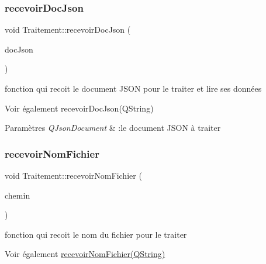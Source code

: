 \mbox{\label{classTraitement_aa66e6be8e21062472a6c1e9a95097dc5}} 
\subsubsection{\texorpdfstring{recevoir\+Doc\+Json}{recevoirDocJson}}
{\footnotesize\ttfamily void Traitement\+::recevoir\+Doc\+Json (\begin{DoxyParamCaption}\item[{Q\+Json\+Document}]{doc\+Json }\end{DoxyParamCaption})\hspace{0.3cm}{\ttfamily [slot]}}



fonction qui recoit le document J\+S\+ON pour le traiter et lire ses données 

\begin{DoxySeeAlso}{Voir également}
recevoir\+Doc\+Json(\+Q\+String) 
\end{DoxySeeAlso}

\begin{DoxyParams}{Paramètres}
{\em Q\+Json\+Document} & \+:le document J\+S\+ON à traiter \\
\hline
\end{DoxyParams}
\mbox{\label{classTraitement_aba97e5df1728c8062c3cb1b9fa104157}} 
\subsubsection{\texorpdfstring{recevoir\+Nom\+Fichier}{recevoirNomFichier}}
{\footnotesize\ttfamily void Traitement\+::recevoir\+Nom\+Fichier (\begin{DoxyParamCaption}\item[{Q\+String}]{chemin }\end{DoxyParamCaption})\hspace{0.3cm}{\ttfamily [slot]}}



fonction qui recoit le nom du fichier pour le traiter 

\begin{DoxySeeAlso}{Voir également}
\hyperlink{classTraitement_aba97e5df1728c8062c3cb1b9fa104157}{recevoir\+Nom\+Fichier(\+Q\+String)} 
\end{DoxySeeAlso}

